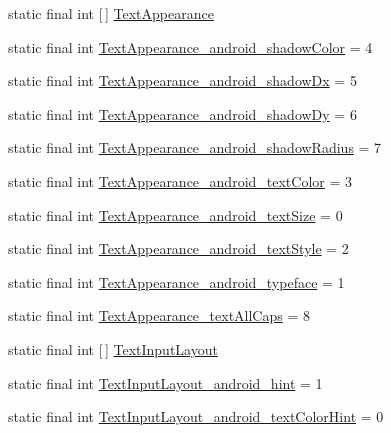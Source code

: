 \begin{DoxyCompactItemize}
\item 
static final int \mbox{[}$\,$\mbox{]} \hyperlink{classproject4_1_1xaria_1_1R_1_1styleable_a324a4bda63d9f00d154e0a6c1eb718b0}{Text\+Appearance}
\item 
static final int \hyperlink{classproject4_1_1xaria_1_1R_1_1styleable_a431d16372e40e52f770ef2d504ae3083}{Text\+Appearance\+\_\+android\+\_\+shadow\+Color} = 4
\item 
static final int \hyperlink{classproject4_1_1xaria_1_1R_1_1styleable_a03f619c3ba347ef286757141c03559b5}{Text\+Appearance\+\_\+android\+\_\+shadow\+Dx} = 5
\item 
static final int \hyperlink{classproject4_1_1xaria_1_1R_1_1styleable_ada1ad6d6bac889ac788f60bdf29ddc1c}{Text\+Appearance\+\_\+android\+\_\+shadow\+Dy} = 6
\item 
static final int \hyperlink{classproject4_1_1xaria_1_1R_1_1styleable_ae958e2bce5916596d134543faa936c61}{Text\+Appearance\+\_\+android\+\_\+shadow\+Radius} = 7
\item 
static final int \hyperlink{classproject4_1_1xaria_1_1R_1_1styleable_a2b25c50bd5f9e42c5a9fc5afb3dbcb37}{Text\+Appearance\+\_\+android\+\_\+text\+Color} = 3
\item 
static final int \hyperlink{classproject4_1_1xaria_1_1R_1_1styleable_aee9f72e6edb60f105b97642812464a80}{Text\+Appearance\+\_\+android\+\_\+text\+Size} = 0
\item 
static final int \hyperlink{classproject4_1_1xaria_1_1R_1_1styleable_aa7aadad2b1e03de56ffff6233004edd3}{Text\+Appearance\+\_\+android\+\_\+text\+Style} = 2
\item 
static final int \hyperlink{classproject4_1_1xaria_1_1R_1_1styleable_a5f9cfadc1fc87f837610aa77360f6e3a}{Text\+Appearance\+\_\+android\+\_\+typeface} = 1
\item 
static final int \hyperlink{classproject4_1_1xaria_1_1R_1_1styleable_ab717490758690b0582f6ffbc6ce728f4}{Text\+Appearance\+\_\+text\+All\+Caps} = 8
\item 
static final int \mbox{[}$\,$\mbox{]} \hyperlink{classproject4_1_1xaria_1_1R_1_1styleable_a5a2e4611c17d75c805194b416b9fed74}{Text\+Input\+Layout}
\item 
static final int \hyperlink{classproject4_1_1xaria_1_1R_1_1styleable_ae1bb656c3c7642a885f1739b13f02e81}{Text\+Input\+Layout\+\_\+android\+\_\+hint} = 1
\item 
static final int \hyperlink{classproject4_1_1xaria_1_1R_1_1styleable_ad0454b679c861e8e4733869036a95b28}{Text\+Input\+Layout\+\_\+android\+\_\+text\+Color\+Hint} = 0

\end{DoxyCompactItemize}
